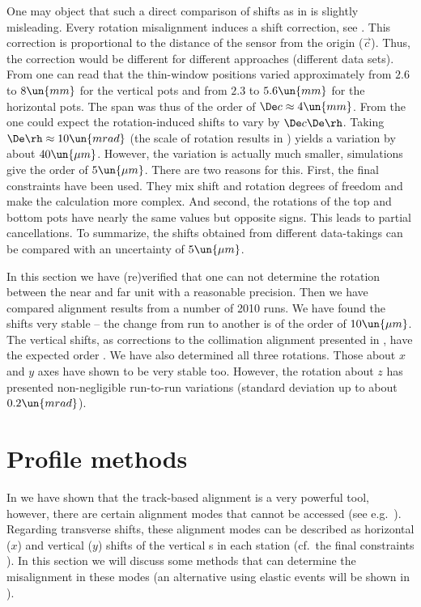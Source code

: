 One may object that such a direct comparison of shifts as in  is slightly misleading. Every rotation misalignment induces a shift correction, see . This correction is proportional to the distance of the sensor from the origin ($\vec c$). Thus, the correction would be different for different  approaches (different data sets). From  one can read that the thin-window positions varied approximately from $2.6$ to $8\un{mm}$ for the vertical pots and from $2.3$ to $5.6\un{mm}$ for the horizontal pots. The span was thus of the order of $\De c \approx 4\un{mm}$. From the  one could expect the rotation-induced shifts to vary by $\De c \De \rh$. Taking $\De\rh \approx 10 \un{mrad}$ (the scale of rotation results in ) yields a variation by about $40\un{\mu m}$. However, the variation is actually much smaller,  simulations give the order of $5\un{\mu m}$. There are two reasons for this. First, the final constraints have been used. They mix shift and rotation degrees of freedom and make the calculation more complex. And second, the rotations of the top and bottom pots have nearly the same values but opposite signs. This leads to partial cancellations. To summarize, the shifts obtained from different data-takings can be compared with an uncertainty of $5\un{\mu m}$.


In this section we have (re)verified that one can not determine the rotation between the near and far unit with a reasonable precision. Then we have compared alignment results from a number of 2010  runs. We have found the  shifts very stable -- the change from run to another is of the order of $10\un{\mu m}$. The vertical  shifts, as corrections to the collimation alignment presented in , have the expected order . We have also determined all three  rotations. Those about $x$ and $y$ axes have shown to be very stable too. However, the rotation about $z$ has presented non-negligible run-to-run variations (standard deviation up to about $0.2\un{mrad}$).


\section[al prof]{Profile methods}

In  we have shown that the track-based alignment is a very powerful tool, however, there are certain alignment modes that cannot be accessed (see e.g.~). Regarding transverse shifts, these alignment modes can be described as horizontal ($x$) and vertical ($y$) shifts of the vertical s in each station (cf.~the final constraints ). In this section we will discuss some methods that can determine the misalignment in these modes (an alternative using elastic events will be shown in ).

